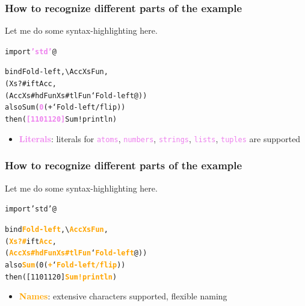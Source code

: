 \documentclass[10pt, compress, handout]{beamer}
\newcommand{\ltt}[1]{\textcolor{violet}{\textbf{#1}}}
\newcommand{\nmt}[1]{\textcolor{orange}{\textbf{#1}}}
\newcommand{\mltt}[1]{\textcolor{violet}{\texttt{#1}}}
\newcommand{\ssti}[1]{#1}
\newcommand{\ltti}[1]{#1}
\begin{document}
\begin{frame}[fragile]
  \frametitle{How to recognize different parts of the example}

  Let me do some syntax-highlighting here.
  \begin{alltt}
  \ssti{import} \ltt{'std'} \ssti{@}

  \ssti{bind} Fold-left \ssti{,\textbackslash} Acc Xs Fun\ssti{,}
    \ssti{(}Xs ?# \ssti{ift} Acc\ssti{,}
       \ssti{(}Acc Xs #hd Fun Xs #tl Fun\ssti{`} Fold-left\ssti{@))}
  \ssti{also} Sum \ssti{(}\ltt{0} \ssti{(}+\ssti{`} Fold-left /flip\ssti{))}
  \ssti{then} \ssti{(}\ltt{[1 10 11 20]} Sum !println\ssti{)}
  \end{alltt}
\vspace{0.5cm}

  \begin{itemize}
  \item \ltt{Literals}: \small literals for \mltt{atoms}, \mltt{numbers}, \mltt{strings}, \mltt{lists}, \mltt{tuples} are supported
\normalsize
  \end{itemize}
\vspace{0.3cm}
\end{frame}

\begin{frame}[fragile]
  \frametitle{How to recognize different parts of the example}

  Let me do some syntax-highlighting here.
  \begin{alltt}
  \ssti{import} \ltti{'std'} \ssti{@}

  \ssti{bind} \nmt{Fold-left} \ssti{,\textbackslash} \nmt{Acc} \nmt{Xs} \nmt{Fun}\ssti{,}
    \ssti{(}\nmt{Xs} \nmt{?#} \ssti{ift} \nmt{Acc}\ssti{,}
       \ssti{(}\nmt{Acc} \nmt{Xs} \nmt{#hd} \nmt{Fun} \nmt{Xs} \nmt{#tl} \nmt{Fun}\ssti{`} \nmt{Fold-left}\ssti{@))}
  \ssti{also} \nmt{Sum} \ssti{(}\ltti{0} \ssti{(}\nmt{+}\ssti{`} \nmt{Fold-left} \nmt{/flip}\ssti{))}
  \ssti{then} \ssti{(}\ltti{[1 10 11 20]} \nmt{Sum} \nmt{!println}\ssti{)}
  \end{alltt}
\vspace{0.5cm}

  \begin{itemize}
  \item \nmt{Names}: \small extensive characters supported, flexible naming \\ ~
\normalsize
  \end{itemize}
\vspace{0.3cm}
\end{frame}
\end{document}
